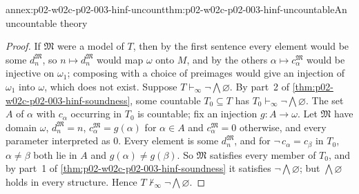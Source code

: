 \begin{annexitem}{annex:p02-w02c-p02-003-hinf-uncount}{thm:p02-w02c-p02-003-hinf-uncountable}{An uncountable theory}
\begin{proof}
If \(\mathfrak M\) were a model of \(T\), then by the first sentence every
element would be some \(d_n^{\mathfrak M}\), so \(n\mapsto d_n^{\mathfrak M}\)
would map \(\omega\) onto \(M\), and by the others
\(\alpha\mapsto c_\alpha^{\mathfrak M}\) would be injective on
\(\omega_1\); composing with a choice of preimages would give an injection
of \(\omega_1\) into \(\omega\), which does not exist.  Suppose
\(T\vdash_{\infty}\neg\bigwedge\varnothing\).  By part~2 of
\cref{thm:p02-w02c-p02-003-hinf-soundness}, some countable
\(T_0\subseteq T\) has \(T_0\vdash_{\infty}\neg\bigwedge\varnothing\).  The
set \(A\) of \(\alpha\) with \(c_\alpha\) occurring in \(T_0\) is
countable; fix an injection \(g:A\to\omega\).  Let \(\mathfrak M\) have
domain \(\omega\), \(d_n^{\mathfrak M}=n\), \(c_\alpha^{\mathfrak M}=g(\alpha)\)
for \(\alpha\in A\) and \(c_\alpha^{\mathfrak M}=0\) otherwise, and every
parameter interpreted as \(0\).  Every element is some \(d_n^{\mathfrak M}\),
and for \(\neg\,c_\alpha=c_\beta\) in \(T_0\), \(\alpha\neq\beta\) both lie
in \(A\) and \(g(\alpha)\neq g(\beta)\).  So \(\mathfrak M\) satisfies every
member of \(T_0\), and by part~1 of
\cref{thm:p02-w02c-p02-003-hinf-soundness} it satisfies
\(\neg\bigwedge\varnothing\); but \(\bigwedge\varnothing\) holds in every
structure.  Hence \(T\nvdash_{\infty}\neg\bigwedge\varnothing\).
\end{proof}
\end{annexitem}

